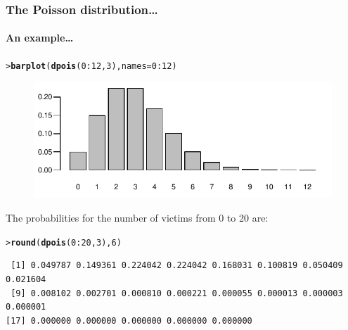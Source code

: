 \documentclass{beamer}\usepackage[]{graphicx}\usepackage[]{xcolor}
\makeatletter
\newcommand{\hlnum}[1]{\textcolor[rgb]{0.686,0.059,0.569}{#1}}%
\newcommand{\hlopt}[1]{\textcolor[rgb]{0,0,0}{#1}}%
\newcommand{\hlstd}[1]{\textcolor[rgb]{0.345,0.345,0.345}{#1}}%
\newcommand{\hlkwc}[1]{\textcolor[rgb]{0.333,0.667,0.333}{#1}}%
\newcommand{\hlkwd}[1]{\textcolor[rgb]{0.737,0.353,0.396}{\textbf{#1}}}%
\newenvironment{kframe}{%
 \def\at@end@of@kframe{}%
 \ifinner\ifhmode%
  \def\at@end@of@kframe{\end{minipage}}%
  \begin{minipage}{\columnwidth}%
 \fi\fi%
 \def\FrameCommand##1{\hskip\@totalleftmargin \hskip-\fboxsep
 \colorbox{shadecolor}{##1}\hskip-\fboxsep
     \hskip-\linewidth \hskip-\@totalleftmargin \hskip\columnwidth}%
 \MakeFramed {\advance\hsize-\width
   \@totalleftmargin\z@ \linewidth\hsize
   \@setminipage}}%
 {\par\unskip\endMakeFramed%
 \at@end@of@kframe}
\newenvironment{knitrout}{}{} %
\makeatother
\begin{document}
\begin{frame}[fragile]
\frametitle{The Poisson distribution\ldots}
\framesubtitle{An example\ldots}
\begin{knitrout}\scriptsize
{}\color{fgcolor}\begin{kframe}
\begin{alltt}
\hlstd{> }\hlkwd{barplot}\hlstd{(}\hlkwd{dpois}\hlstd{(}\hlnum{0}\hlopt{:}\hlnum{12}\hlstd{,}\hlnum{3}\hlstd{),}\hlkwc{names}\hlstd{=}\hlnum{0}\hlopt{:}\hlnum{12}\hlstd{)}
\end{alltt}
\end{kframe}
\end{knitrout}



\begin{figure}
  \centering
  \includegraphics{figure/RC-H13-015}
\end{figure}


\medskip

The probabilities for the number of victims from 0 to 20 are:
\begin{knitrout}\scriptsize
{}\color{fgcolor}\begin{kframe}
\begin{alltt}
\hlstd{> }\hlkwd{round}\hlstd{(}\hlkwd{dpois}\hlstd{(}\hlnum{0}\hlopt{:}\hlnum{20}\hlstd{,}\hlnum{3}\hlstd{),}\hlnum{6}\hlstd{)}
\end{alltt}
\begin{verbatim}
 [1] 0.049787 0.149361 0.224042 0.224042 0.168031 0.100819 0.050409 0.021604
 [9] 0.008102 0.002701 0.000810 0.000221 0.000055 0.000013 0.000003 0.000001
[17] 0.000000 0.000000 0.000000 0.000000 0.000000
\end{verbatim}
\end{kframe}
\end{knitrout}
\end{frame}
\end{document}
